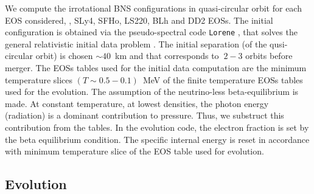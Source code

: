 We compute the irrotational \ac{BNS} configurations in quasi-circular orbit for 
each \ac{EOS} considered, \eg, SLy4, SFHo, LS220, BLh and DD2 \acp{EOS}.
The initial configuration is obtained via the pseudo-spectral code \texttt{Lorene} \citep{Gourgoulhon:2000nn}, 
that solves the general relativistic initial data problem .
The initial separation (of the qusi-circular orbit) is chosen $\sim40$~km and that
 corresponds to $~2-3$ orbits before merger.
%
The \acp{EOS} tables used for the initial data computation are the minimum temperature slices
$(T\sim 0.5 - 0.1)$~MeV of the finite temperature \acp{EOS} tables used for the evolution.
The assumption of the neutrino-less beta-equilibrium is made.
At constant temperature, at lowest densities, the photon energy (radiation) is a dominant 
contribution to pressure. Thus, we substruct this contribution from the tables.
%
In the evolution code, the electron fraction is set by the beta equilibrium condition. 
The specific internal energy is reset in accordance with minimum 
temperature slice of the \ac{EOS} table used for evolution.






\subsection{Evolution}


